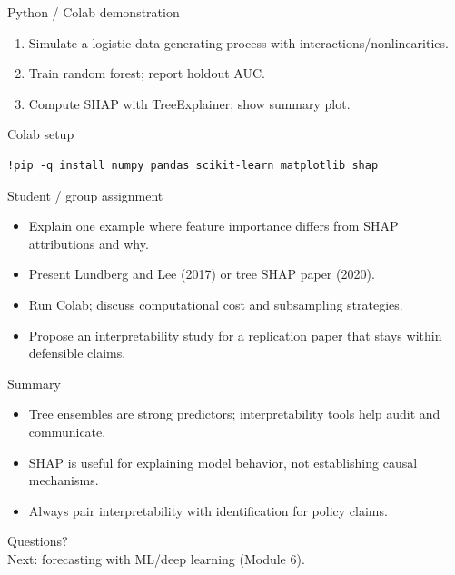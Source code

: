 \documentclass[aspectratio=169,11pt]{beamer}
\begin{document}
\begin{frame}{Python / Colab demonstration}
  \begin{enumerate}
    \item Simulate a logistic data-generating process with interactions/nonlinearities.
    \item Train random forest; report holdout AUC.
    \item Compute SHAP with TreeExplainer; show summary plot.
  \end{enumerate}
\end{frame}

\begin{frame}[fragile]{Colab setup}
  \begin{verbatim}
!pip -q install numpy pandas scikit-learn matplotlib shap
  \end{verbatim}
\end{frame}

\begin{frame}{Student / group assignment}
  \begin{itemize}
    \item Explain one example where feature importance differs from SHAP attributions and why.
    \item Present Lundberg and Lee (2017) or tree SHAP paper (2020).
    \item Run Colab; discuss computational cost and subsampling strategies.
    \item Propose an interpretability study for a replication paper that stays within defensible claims.
  \end{itemize}
\end{frame}

\begin{frame}{Summary}
  \begin{itemize}
    \item Tree ensembles are strong predictors; interpretability tools help audit and communicate.
    \item SHAP is useful for explaining model behavior, not establishing causal mechanisms.
    \item Always pair interpretability with identification for policy claims.
  \end{itemize}
\end{frame}

\begin{frame}[plain]
  \begin{center}
    \Large Questions?\\[0.8em]
    \normalsize Next: forecasting with ML/deep learning (Module 6).
  \end{center}
\end{frame}
\end{document}
